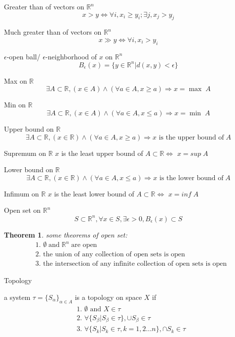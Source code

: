 \documentclass{article}
\newtheorem{theorem}{Theorem}
\begin{document}
Greater than of vectors on $\mathbb{R}^n$
$$x>y \iff \forall i, x_{i}\geqslant y_{i}; \exists j,x_{j}>y_{j}$$

Much greater than of vectors on $\mathbb{R}^n$
$$x \gg y \iff \forall i,x_{i}>y_{i}$$

$\epsilon$-open ball/ $\epsilon$-neighborhood of $x$ on $\mathbb{R}^n$
$$B_{\epsilon}(x)=\{y\in \mathbb{R}^{n}|d(x,y)< \epsilon\}$$

Max on $\mathbb{R}$ 
$$\exists A \subset \mathbb{R},(x\in A)\land(\forall a \in A, x \geqslant a) \Rightarrow x=\max \;A$$

Min on $\mathbb{R}$ 
$$\exists A \subset \mathbb{R},(x\in A)\land(\forall a \in A, x \leqslant a) \Rightarrow x=\min \;A$$

Upper bound on $\mathbb{R}$
$$\exists A \subset \mathbb{R},(x\in \mathbb{R})\land(\forall a \in A, x \geqslant a) \Rightarrow x\text{ is the upper bound of}\;A$$

Supremum on $\mathbb{R}$
$x$ is the least upper bound of $A \subset \mathbb{R} \iff$ $x=sup \; A$ 

Lower bound on $\mathbb{R}$
$$\exists A \subset \mathbb{R},(x\in \mathbb{R})\land(\forall a \in A, x \leqslant a) \Rightarrow x \text{ is the lower bound of} \;A$$

Infimum on $\mathbb{R}$
$x$ is the least lower bound of $A \subset \mathbb{R} \iff$ $x=inf\;A$

Open set on $\mathbb{R}^{n}$
$$S\subset \mathbb{R}^{n},\forall x \in S, \exists \epsilon >0, B_\epsilon(x)\subset S$$

\begin{theorem}
some theorems of open set:
\begin{align}
&\text{1. } \emptyset \; \text{and} \; \mathbb{R}^{n}\; \text{are open}
\\&\text{2. the union of any collection of open sets is open} 
\\&\text{3. the intersection of any infinite collection of open sets is open}
\end{align}
\end{theorem}

Topology

a system $\tau=\{S_{\alpha}\}_{\alpha\in A}$ is a topology on space $X$ if
\begin{align}
&\text{1. }\emptyset \text{ and }X \in \tau
\\&\text{2. } \forall \{S_{\beta}|S_{\beta}\in \tau\}, \cup S_{\beta} \in \tau
\\&\text{3. } \forall \{S_{k}|S_{k}\in \tau,k=1,2...n\}, \cap S_{k}\in \tau
\end{align}
\end{document}

